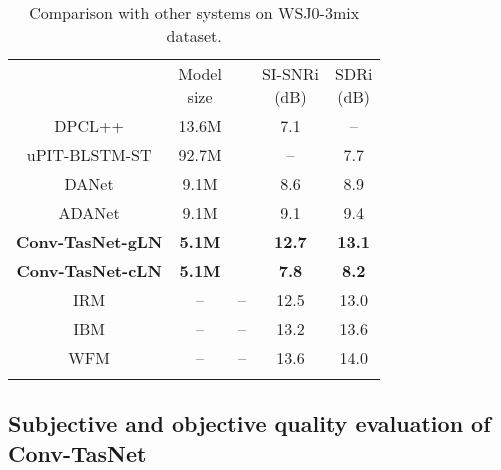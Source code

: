 \documentclass[journal]{IEEEtran}
\def\thline{\noalign{\hrule height 1.0pt}}
\begin{document}
\begin{table}[!htbp]
	\small
	\centering
	\caption{Comparison with other systems on WSJ0-3mix dataset.}
	\vspace{0.2cm}
	\label{tab:result-comp3}
	\begin{tabular}{c|c|c|c|c}
		\thline
		\thead{Method} & \thead{Model \\ size} & \thead{Causal} & \thead{SI-SNRi\\ (dB)} &\thead{SDRi\\ (dB)} \\
		\thline
		
		DPCL++ \cite{isik2016single} & 13.6M & \texttimes & 7.1 & -- \\
		uPIT-BLSTM-ST \cite{kolbaek2017multitalker} & 92.7M & \texttimes & -- & 7.7 \\
		DANet \cite{chen2017deep} & 9.1M & \texttimes & 8.6 & 8.9 \\
		ADANet \cite{luo2017speaker} & 9.1M  & \texttimes & 9.1 & 9.4 \\
		\bf{Conv-TasNet-gLN} & \bf{5.1M} & \texttimes & \bf{12.7} & \bf{13.1} \\
		\hline
		\bf{Conv-TasNet-cLN} & \bf{5.1M} & \checkmark & \bf{7.8} & \bf{8.2}  \\
		\thline
		IRM & --  & -- & 12.5 & 13.0 \\
		IBM & --  & -- & 13.2 & 13.6 \\
		WFM & --  & -- & 13.6 & 14.0 \\
		\thline
	\end{tabular}
\end{table}


\subsection{Subjective and objective quality evaluation of Conv-TasNet}
\end{document}
